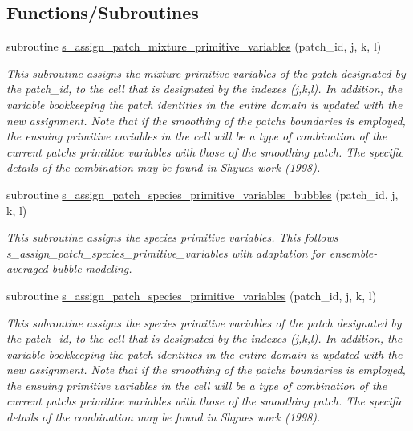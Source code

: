 \subsection*{Functions/\+Subroutines}
\begin{DoxyCompactItemize}
\item 
subroutine \hyperlink{namespacem__initial__condition_ac414f08eb31dad32ed313767d214df72}{s\+\_\+assign\+\_\+patch\+\_\+mixture\+\_\+primitive\+\_\+variables} (patch\+\_\+id, j, k, l)
\begin{DoxyCompactList}\small\item\em This subroutine assigns the mixture primitive variables of the patch designated by the patch\+\_\+id, to the cell that is designated by the indexes (j,k,l). In addition, the variable bookkeeping the patch identities in the entire domain is updated with the new assignment. Note that if the smoothing of the patch\textquotesingle{}s boundaries is employed, the ensuing primitive variables in the cell will be a type of combination of the current patch\textquotesingle{}s primitive variables with those of the smoothing patch. The specific details of the combination may be found in Shyue\textquotesingle{}s work (1998). \end{DoxyCompactList}\item 
subroutine \hyperlink{namespacem__initial__condition_abd7cee461afabc01b81373e4be5a20c7}{s\+\_\+assign\+\_\+patch\+\_\+species\+\_\+primitive\+\_\+variables\+\_\+bubbles} (patch\+\_\+id, j, k, l)
\begin{DoxyCompactList}\small\item\em This subroutine assigns the species primitive variables. This follows s\+\_\+assign\+\_\+patch\+\_\+species\+\_\+primitive\+\_\+variables with adaptation for ensemble-\/averaged bubble modeling. \end{DoxyCompactList}\item 
subroutine \hyperlink{namespacem__initial__condition_a0024bfbe15f4f49cb2a5a2c574d89e19}{s\+\_\+assign\+\_\+patch\+\_\+species\+\_\+primitive\+\_\+variables} (patch\+\_\+id, j, k, l)
\begin{DoxyCompactList}\small\item\em This subroutine assigns the species primitive variables of the patch designated by the patch\+\_\+id, to the cell that is designated by the indexes (j,k,l). In addition, the variable bookkeeping the patch identities in the entire domain is updated with the new assignment. Note that if the smoothing of the patch\textquotesingle{}s boundaries is employed, the ensuing primitive variables in the cell will be a type of combination of the current patch\textquotesingle{}s primitive variables with those of the smoothing patch. The specific details of the combination may be found in Shyue\textquotesingle{}s work (1998). \end{DoxyCompactList}\item 

\end{DoxyCompactItemize}

